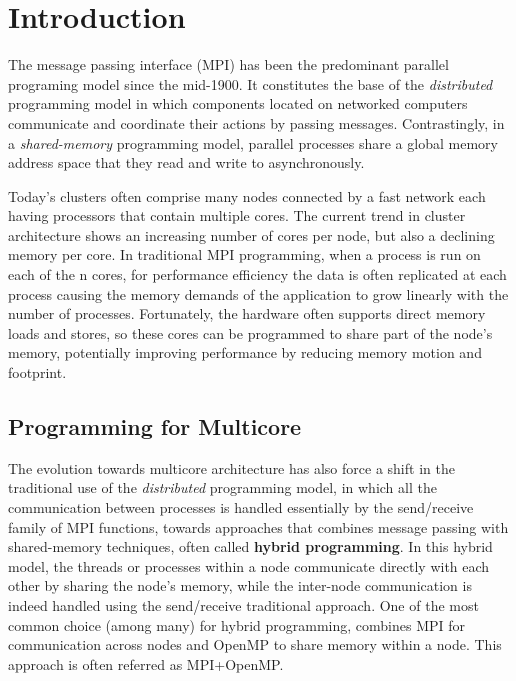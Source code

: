 \section{Introduction}
The message passing interface (MPI) has been the predominant parallel programing model since the mid-1900. It constitutes the base of the \emph{distributed} programming model in which components located on networked computers communicate and coordinate their actions by passing messages. Contrastingly, in a \emph{shared-memory} programming model, parallel processes share a global memory address space that they read and write to asynchronously. 

Today's clusters often comprise many nodes connected by a fast network each having processors that contain multiple cores. The current trend in cluster architecture shows an increasing number of cores per node, but also a declining memory per core. In traditional MPI programming, when a process is run on each of the n cores, for performance efficiency the data is often replicated at each process causing the memory demands of the application to grow linearly with the number of processes. Fortunately, the hardware often supports direct memory loads and stores, so these cores can be programmed to share part of the node's memory, potentially improving performance by reducing memory motion and footprint\cite{UsingAdvancedMPI}. 



\subsection*{Programming for Multicore}

The evolution towards multicore architecture has also force a shift in the traditional use of the \emph{distributed} programming model, in which all the communication between processes is handled essentially by the send/receive family of MPI functions, towards approaches that combines message passing with shared-memory techniques, often called \textbf{hybrid programming}\cite{UsingAdvancedMPI}. In this hybrid model, the threads or processes within a node communicate directly with each other by sharing the node's memory, while the inter-node communication is indeed handled using the send/receive traditional approach. One of the most common choice (among many) for hybrid programming, combines MPI for communication across nodes and OpenMP to share memory within a node. This approach is often referred as MPI+OpenMP.

